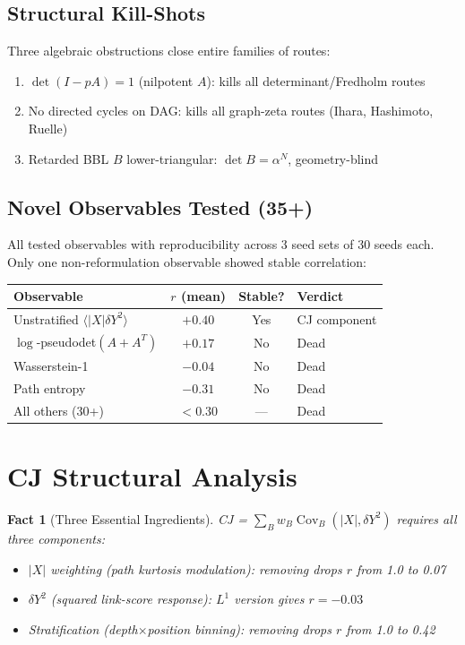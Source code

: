 \documentclass[11pt,a4paper]{article}
\newtheorem{fact}{Fact}
\begin{document}
\subsection{Structural Kill-Shots}

Three algebraic obstructions close entire families of routes:
\begin{enumerate}
\item $\det(I - pA) = 1$ (nilpotent $A$): kills all determinant/Fredholm routes
\item No directed cycles on DAG: kills all graph-zeta routes (Ihara, Hashimoto, Ruelle)
\item Retarded BBL $B$ lower-triangular: $\det B = \alpha^N$, geometry-blind
\end{enumerate}

\subsection{Novel Observables Tested (35+)}

All tested observables with reproducibility across 3 seed sets of 30 seeds each. Only one non-reformulation observable showed stable correlation:

\begin{center}
\begin{tabular}{lccl}
\toprule
Observable & $r$ (mean) & Stable? & Verdict \\
\midrule
Unstratified $\langle|X|\delta Y^2\rangle$ & $+0.40$ & Yes & CJ component \\
$\log$-pseudodet$(A+A^T)$ & $+0.17$ & No & Dead \\
Wasserstein-1 & $-0.04$ & No & Dead \\
Path entropy & $-0.31$ & No & Dead \\
All others (30+) & $< 0.30$ & --- & Dead \\
\bottomrule
\end{tabular}
\end{center}

\section{CJ Structural Analysis}

\begin{fact}[Three Essential Ingredients]
CJ = $\sum_B w_B \operatorname{Cov}_B(|X|, \delta Y^2)$ requires all three components:
\begin{itemize}
\item $|X|$ weighting (path kurtosis modulation): removing drops $r$ from 1.0 to 0.07
\item $\delta Y^2$ (squared link-score response): $L^1$ version gives $r = -0.03$
\item Stratification (depth$\times$position binning): removing drops $r$ from 1.0 to 0.42
\end{itemize}
\end{fact}
\end{document}
